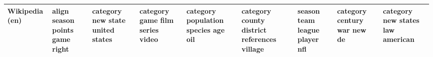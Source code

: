 \documentclass[11pt,a4paper]{article}
\begin{document}
\begin{appendices}
\begin{table*}[htb]
\begin{tiny}
\begin{tabular}{|p{}|p{}|p{}|p{}|p{}|p{}|p{}|p{}|p{}|}
    Wikipedia (en) & align \newline season \newline points \newline game \newline right & category \newline new \newline state \newline united \newline states & category \newline game \newline film \newline series \newline video & category \newline population \newline species \newline age \newline oil & category \newline county \newline district \newline references \newline village & season \newline team \newline league \newline player \newline nfl & category \newline century \newline war \newline new \newline de & category \newline new \newline states \newline law \newline american\\\hline

\end{tabular}
\end{tiny}
\end{table*}
\end{appendices}
\end{document}
